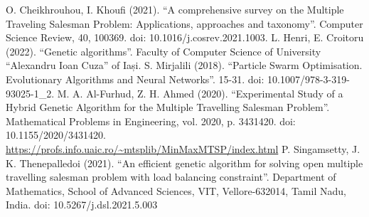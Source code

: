 \documentclass[conference]{IEEEtran}
\begin{document}
\begin{thebibliography}{00}
     O. Cheikhrouhou, I. Khoufi (2021). ``A comprehensive survey on the Multiple Traveling Salesman Problem: Applications, approaches and taxonomy''. Computer Science Review, 40, 100369. doi: 10.1016/j.cosrev.2021.1003.
     L. Henri, E. Croitoru (2022). ``Genetic algorithms''. Faculty of Computer Science of University ``Alexandru Ioan Cuza'' of Iași.
     S. Mirjalili (2018). ``Particle Swarm Optimisation. Evolutionary Algorithms and Neural Networks''. 15-31. doi: 10.1007/978-3-319-93025-1\_2.
     M. A. Al-Furhud, Z. H. Ahmed (2020). ``Experimental Study of a Hybrid Genetic Algorithm for the Multiple Travelling Salesman Problem''. Mathematical Problems in Engineering, vol. 2020, p. 3431420. doi: 10.1155/2020/3431420.
     \url{https://profs.info.uaic.ro/~mtsplib/MinMaxMTSP/index.html}
     P. Singamsetty, J. K. Thenepalledoi (2021). ``An efficient genetic algorithm for solving open multiple travelling salesman problem with load
    balancing constraint''. Department of Mathematics, School of Advanced Sciences, VIT, Vellore-632014, Tamil Nadu, India. doi: 10.5267/j.dsl.2021.5.003
\end{thebibliography}
    
\end{document}
